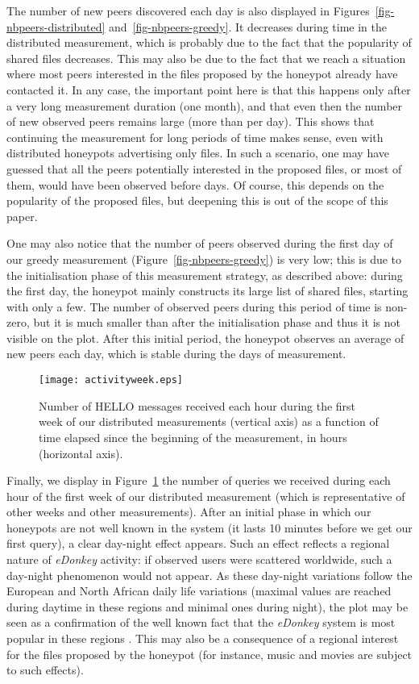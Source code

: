 \documentclass[final,
notitlepage,
narroweqnarray,
	inline,
	twoside,
]{ieee}
\begin{document}
The number of new peers discovered each day is also displayed in Figures~\ref{fig-nbpeers-distributed} and~\ref{fig-nbpeers-greedy}. It decreases during time in the distributed measurement, which is probably due to the fact that the popularity of shared files decreases. This may also be due to the fact that we reach a situation where most peers interested in the files proposed by the honeypot already have contacted it. In any case, the important point here is that this happens only after a very long measurement duration (one month), and that even then the number of new observed peers remains large (more than  per day). This shows that continuing the measurement for long periods of time makes sense, even with  distributed honeypots advertising only  files. In such a scenario, one may have guessed that all the peers potentially interested in the proposed files, or most of them, would have been observed before  days. Of course, this depends on the popularity of the proposed files, but deepening this is out of the scope of this paper.

One may also notice that the number of peers observed during the first day of our greedy measurement (Figure~\ref{fig-nbpeers-greedy}) is very low; this is due to the initialisation phase of this measurement strategy, as described above: during the first day, the honeypot mainly constructs its large list of shared files, starting with only a few. The number of observed peers during this period of time is non-zero, but it is much smaller than after the initialisation phase and thus it is not visible on the plot. After this initial period, the honeypot observes an average of  new peers each day, which is stable during the  days of measurement.

\begin{figure}[h!]
\centering
\texttt{[image: activityweek.eps]}
\caption{Number of HELLO messages received each hour   during the first
  week of our distributed measurements (vertical axis)
  as a function of  time elapsed
  since the beginning of the measurement, in hours (horizontal axis).}
\label{fig-nbpeers-time}
\end{figure}

Finally, we display in Figure~\ref{fig-nbpeers-time} the number of
queries we received during each hour of the first week of our
distributed measurement (which is representative of other weeks and
other measurements). After an initial phase in which our honeypots are
not well known in the system (it lasts 10 minutes before we get our
first query), a clear day-night effect appears. Such an effect
reflects a regional nature of {\em eDonkey} activity: if observed users were
scattered worldwide, such a day-night phenomenon would not appear. As
these day-night variations follow the European and North African daily
life variations (maximal values are reached during daytime in these
regions and minimal ones during night), the plot may be seen as a
confirmation of the well known fact that the {\em eDonkey} system is most
popular in these regions \cite{fed1,fed2}. This may also be a
consequence of a regional interest for the files proposed by the
honeypot (for instance, music and movies are subject to such effects).
\end{document}
